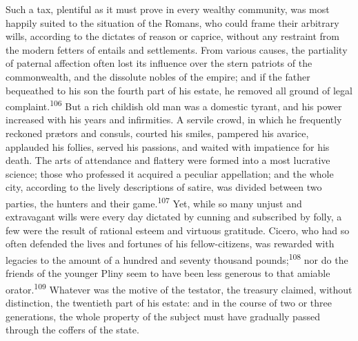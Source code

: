 



Such a tax, plentiful as it must prove in every wealthy
community, was most happily suited to the situation of the
Romans, who could frame their arbitrary wills, according to the
dictates of reason or caprice, without any restraint from the
modern fetters of entails and settlements. From various causes,
the partiality of paternal affection often lost its influence
over the stern patriots of the commonwealth, and the dissolute
nobles of the empire; and if the father bequeathed to his son the
fourth part of his estate, he removed all ground of legal
complaint.\textsuperscript{106} But a rich childish old man was a domestic tyrant,
and his power increased with his years and infirmities. A servile
crowd, in which he frequently reckoned prætors and consuls,
courted his smiles, pampered his avarice, applauded his follies,
served his passions, and waited with impatience for his death.
The arts of attendance and flattery were formed into a most
lucrative science; those who professed it acquired a peculiar
appellation; and the whole city, according to the lively
descriptions of satire, was divided between two parties, the
hunters and their game.\textsuperscript{107} Yet, while so many unjust and
extravagant wills were every day dictated by cunning and
subscribed by folly, a few were the result of rational esteem and
virtuous gratitude. Cicero, who had so often defended the lives
and fortunes of his fellow-citizens, was rewarded with legacies
to the amount of a hundred and seventy thousand pounds;\textsuperscript{108} nor
do the friends of the younger Pliny seem to have been less
generous to that amiable orator.\textsuperscript{109} Whatever was the motive of
the testator, the treasury claimed, without distinction, the
twentieth part of his estate: and in the course of two or three
generations, the whole property of the subject must have
gradually passed through the coffers of the state.


